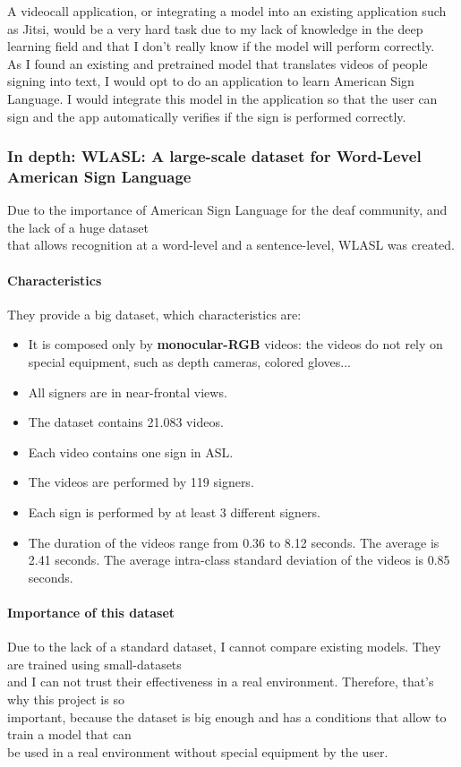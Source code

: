 A videocall application, or integrating a model into an existing application such as Jitsi, would be a very hard task due to my lack of knowledge in the deep learning field and that I don't really know if the model will perform correctly. \\ 

As I found an existing and pretrained model that translates videos of people signing into text, I would opt to do an application to learn American Sign Language. I would integrate this model in the application so that the user can sign and the app automatically verifies if the sign is performed correctly.

\subsubsection{In depth: WLASL: A large-scale dataset for Word-Level American Sign Language}
Due to the importance of American Sign Language for the deaf community, and the lack of a huge dataset \\
that allows recognition at a word-level and a sentence-level, WLASL was created. 

\paragraph{Characteristics}
They provide a big dataset, which characteristics are:
\begin{itemize}[noitemsep]
    \item It is composed only by \textbf{monocular-RGB} videos: the videos do not rely on special equipment, such as depth cameras, colored gloves...
    \item All signers are in near-frontal views.
    \item The dataset contains 21.083 videos.
    \item Each video contains one sign in ASL.
    \item The videos are performed by 119 signers.
    \item Each sign is performed by at least 3 different signers.
    \item The duration of the videos range from 0.36 to 8.12 seconds. The average is 2.41 seconds. The average intra-class standard deviation of the videos is 0.85 seconds.
\end{itemize}

\paragraph{Importance of this dataset}
Due to the lack of a standard dataset, I cannot compare existing models. They are trained using small-datasets \\
and I can not trust their effectiveness in a real environment. Therefore, that's why this project is so \\
important, because the dataset is big enough and has a conditions that allow to train a model that can \\
be used in a real environment without special equipment by the user.

